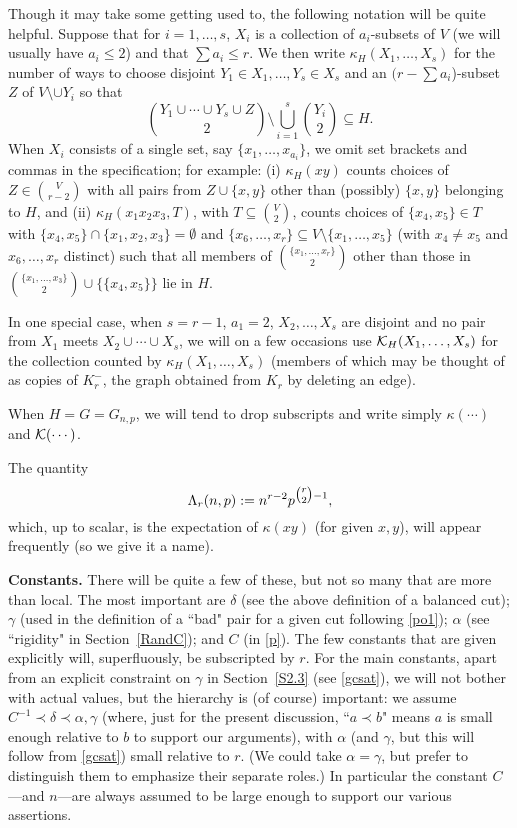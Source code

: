 \documentclass[letterpaper,11pt]{article}
\newcommand{\beq}[1]{\begin{equation}\label{#1}}
\newcommand{\enq}[0]{\end{equation}}
\newcommand{\mn}[0]{\medskip\noindent}
\newcommand{\sub}[0]{\subseteq}
\newcommand{\sm}[0]{\setminus}
\renewcommand{\dots}[0]{,\ldots,}
\newcommand{\K}[0]{{\cal K}}
\newcommand{\0}[0]{\emptyset}
\newcommand{\C}[2]{{{#1}\choose{{#2}}}}
\newcommand{\Cc}[0]{\tbinom}
\newcommand{\ga}[0]{\alpha }
\newcommand{\gc}[0]{\gamma }
\newcommand{\gd}[0]{\delta }
\newcommand{\gL}[0]{\Lambda}
\begin{document}
\medskip
Though it may take some getting used to,
the following notation will
be quite helpful.
%
Suppose that for $i=1\dots s$, $X_i$ is a collection of
$a_i$-subsets of $V$
(we will usually have $a_i\leq 2$)
and that $\sum a_i\leq r$.
We then write
$\kappa_H(X_1\dots X_s)$ for the number of ways to choose
disjoint $Y_1\in X_1\dots Y_s\in X_s$ and
an $(r-\sum a_i$)-subset $Z$ of $V\sm \cup Y_i$ so that
\[
\C{Y_1\cup\cdots \cup Y_s\cup Z}{2}
\sm \bigcup_{i=1}^s\C{Y_i}{2}\sub H.
\]
When $X_i$ consists of a single set, say $\{x_1\dots x_{a_i}\}$,
we omit set brackets and commas in the specification;
for example:  (i) $\kappa_H(xy)$ counts choices of $Z\in \C{V}{r-2}$
with all pairs from $Z\cup \{x,y\}$ other than (possibly)
$\{x,y\}$ belonging to $H$,
and
(ii) $\kappa_H(x_1x_2x_3,T)$, with $T\sub \C{V}{2}$,
counts choices of $\{x_4,x_5\}\in T$ with
$\{x_4,x_5\}\cap \{x_1,x_2,x_3\}=\0$
and
$\{x_6\dots x_r\}\sub V\sm \{x_1\dots x_5\}$
(with $x_4\neq x_5$ and $x_6\dots x_r$ distinct)
such that all members
of $\C{\{x_1\dots x_r\}}{2}$
other than those in
$\C{\{x_1\dots x_3\}}{2}\cup \{\{x_4,x_5\}\}$
lie in $H$.



In one special case, when $s=r-1$, $a_1=2$, $X_2\dots X_s$
are disjoint and no pair from $X_1$ meets $X_2\cup\cdots\cup X_s$,
we will on a few occasions use $\K_H(X_1\dots X_s)$ for the collection
counted by $\kappa_H(X_1\dots X_s)$
(members of which may be thought of as copies of $K_r^-$,
the graph obtained from $K_r$ by deleting an edge).





When $H=G=G_{n,p}$, we will tend to
drop subscripts and write simply $\kappa(\cdots)$
and $\K(\cdots)$.

\medskip
The quantity
\beq{gLr}
\gL_r(n,p) := n^{r-2}p^{\Cc{r}{2}-1},
\enq
which, up to scalar, is
the expectation of $\kappa(xy)$ (for given $x,y$),
will appear frequently (so we give it a name).
%



\mn
{\bf Constants.}
%
There will be quite a few of these, but not so many that are more than local.
The most important are $\gd$ (see the above definition of a balanced cut);
$\gc$ (used in the definition of a ``bad" pair for a given cut following \eqref{po1});
$\ga$ (see ``rigidity" in Section~\ref{RandC});
and $C$ (in \eqref{p}).
The few constants that are given explicitly will, superfluously, be subscripted by $r$.
For the main constants, apart from an explicit constraint on
$\gc$ in Section~\ref{S2.3}
(see \eqref{gcsat}), we will not bother with actual values,
but the hierarchy is (of course) important:  we assume
$C^{-1} \prec \gd \prec \ga,\gc$
(where, just for the present discussion, ``$a\prec b$" means
$a$ is small enough relative to $b$ to support our arguments),
with $\ga$ (and $\gc$, but this will follow from \eqref{gcsat})
small relative to $r$.
(We could take $\ga=\gc$,
but prefer to distinguish them to emphasize their separate roles.)
In particular the constant $C$---and $n$---are always assumed to be large enough to
support our various assertions.
\end{document}
